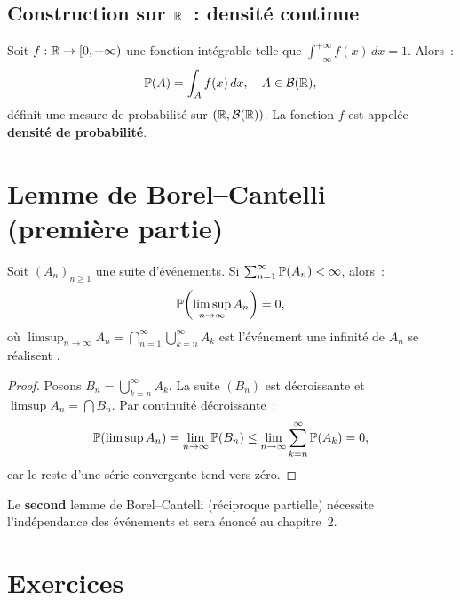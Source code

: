 \subsection{Construction sur $\mathbb{R}$~: densit\'e continue}

\begin{proposition}
Soit $f : \mathbb{R} \to [0, +\infty)$ une fonction int\'egrable telle que
$\int_{-\infty}^{+\infty} f(x)\, dx = 1$. Alors~:
\[
    \mathbb{P}(A) = \int_A f(x)\, dx, \quad A \in \mathcal{B}(\mathbb{R}),
\]
d\'efinit une mesure de probabilit\'e sur $(\mathbb{R}, \mathcal{B}(\mathbb{R}))$. La fonction $f$
est appel\'ee \textbf{densit\'e de probabilit\'e}.
\end{proposition}

\section{Lemme de Borel--Cantelli (premi\`ere partie)}

\begin{theoreme}
\label{thm:borel_cantelli_1}
Soit $(A_n)_{n \geq 1}$ une suite d'\'ev\'enements. Si
$\sum_{n=1}^{\infty} \mathbb{P}(A_n) < \infty$, alors~:
\[
    \mathbb{P}\!\left(\limsup_{n \to \infty} A_n\right) = 0,
\]
o\`u $\displaystyle\limsup_{n \to \infty} A_n
= \bigcap_{n=1}^{\infty} \bigcup_{k=n}^{\infty} A_k$ est l'\'ev\'enement
\og une infinit\'e de $A_n$ se r\'ealisent \fg.
\end{theoreme}

\begin{proof}
Posons $B_n = \bigcup_{k=n}^{\infty} A_k$. La suite $(B_n)$ est d\'ecroissante et
$\limsup A_n = \bigcap B_n$. Par continuit\'e d\'ecroissante~:
\[
    \mathbb{P}(\limsup A_n) = \lim_{n \to \infty} \mathbb{P}(B_n)
    \leq \lim_{n \to \infty} \sum_{k=n}^{\infty} \mathbb{P}(A_k) = 0,
\]
car le reste d'une s\'erie convergente tend vers z\'ero.
\end{proof}

\begin{remarque}
Le \textbf{second} lemme de Borel--Cantelli (r\'eciproque partielle) n\'ecessite
l'ind\'ependance des \'ev\'enements et sera \'enonc\'e au chapitre~2.
\end{remarque}

\section{Exercices}

